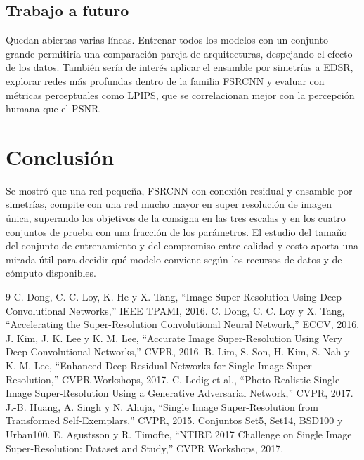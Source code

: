 \documentclass[conference]{IEEEtran}
\begin{document}
\subsection{Trabajo a futuro}
Quedan abiertas varias líneas. Entrenar todos los modelos con un conjunto grande permitiría una
comparación pareja de arquitecturas, despejando el efecto de los datos. También sería de interés
aplicar el ensamble por simetrías a EDSR, explorar redes más profundas dentro de la familia FSRCNN
y evaluar con métricas perceptuales como LPIPS, que se correlacionan mejor con la percepción humana
que el PSNR.

\section*{Conclusión}
Se mostró que una red pequeña, FSRCNN con conexión residual y ensamble por simetrías, compite con
una red mucho mayor en super resolución de imagen única, superando los objetivos de la consigna en
las tres escalas y en los cuatro conjuntos de prueba con una fracción de los parámetros. El estudio
del tamaño del conjunto de entrenamiento y del compromiso entre calidad y costo aporta una mirada
útil para decidir qué modelo conviene según los recursos de datos y de cómputo disponibles.

\begin{thebibliography}{9}
 C. Dong, C. C. Loy, K. He y X. Tang, ``Image Super-Resolution Using Deep
Convolutional Networks,'' IEEE TPAMI, 2016.
 C. Dong, C. C. Loy y X. Tang, ``Accelerating the Super-Resolution Convolutional
Neural Network,'' ECCV, 2016.
 J. Kim, J. K. Lee y K. M. Lee, ``Accurate Image Super-Resolution Using Very Deep
Convolutional Networks,'' CVPR, 2016.
 B. Lim, S. Son, H. Kim, S. Nah y K. M. Lee, ``Enhanced Deep Residual Networks for
Single Image Super-Resolution,'' CVPR Workshops, 2017.
 C. Ledig et al., ``Photo-Realistic Single Image Super-Resolution Using a
Generative Adversarial Network,'' CVPR, 2017.
 J.-B. Huang, A. Singh y N. Ahuja, ``Single Image Super-Resolution from
Transformed Self-Exemplars,'' CVPR, 2015. Conjuntos Set5, Set14, BSD100 y Urban100.
 E. Agustsson y R. Timofte, ``NTIRE 2017 Challenge on Single Image
Super-Resolution: Dataset and Study,'' CVPR Workshops, 2017.
\end{thebibliography}
\end{document}
